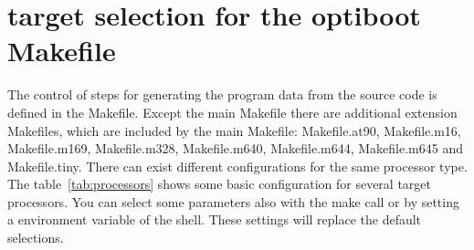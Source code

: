 \section{target selection for the optiboot Makefile}

The control of steps for generating the program data from
the source code is defined in the Makefile.
Except the main Makefile there are additional extension Makefiles,
which are included by the main Makefile:
Makefile.at90, Makefile.m16, Makefile.m169, Makefile.m328, Makefile.m640, Makefile.m644,
Makefile.m645 and Makefile.tiny.
There can exist different configurations for the same processor type.
The table~\ref{tab:processors} shows some basic configuration
for several target processors.
You can select some parameters also with the make call or by setting
a environment variable  of the shell. These settings will replace the default selections.

